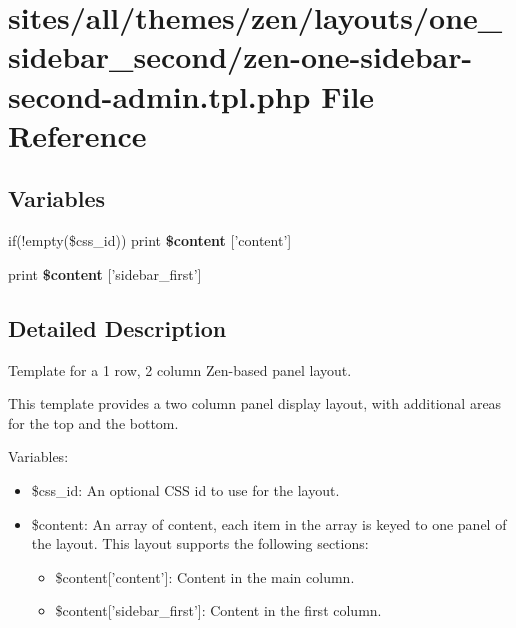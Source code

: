 \hypertarget{zen-one-sidebar-second-admin_8tpl_8php}{
\section{sites/all/themes/zen/layouts/one\_\-sidebar\_\-second/zen-one-sidebar-second-admin.tpl.php File Reference}
\label{zen-one-sidebar-second-admin_8tpl_8php}
}
\subsection*{Variables}
\begin{CompactItemize}
\item 
\hypertarget{zen-one-sidebar-second-admin_8tpl_8php_16767ac2e2b027ec00a0c12535d2ba7a}{
if(!empty(\$css\_\-id)) print \textbf{\$content} \mbox{[}'content'\mbox{]}}
\label{zen-one-sidebar-second-admin_8tpl_8php_16767ac2e2b027ec00a0c12535d2ba7a}

\item 
\hypertarget{zen-one-sidebar-second-admin_8tpl_8php_8fbe76276dfb5a084cc042c32e8e6394}{
print \textbf{\$content} \mbox{[}'sidebar\_\-first'\mbox{]}}
\label{zen-one-sidebar-second-admin_8tpl_8php_8fbe76276dfb5a084cc042c32e8e6394}

\end{CompactItemize}


\subsection{Detailed Description}
Template for a 1 row, 2 column Zen-based panel layout.

This template provides a two column panel display layout, with additional areas for the top and the bottom.

Variables:\begin{itemize}
\item \$css\_\-id: An optional CSS id to use for the layout.\item \$content: An array of content, each item in the array is keyed to one panel of the layout. This layout supports the following sections:\begin{itemize}
\item \$content\mbox{[}'content'\mbox{]}: Content in the main column.\item \$content\mbox{[}'sidebar\_\-first'\mbox{]}: Content in the first column. \end{itemize}
\end{itemize}
